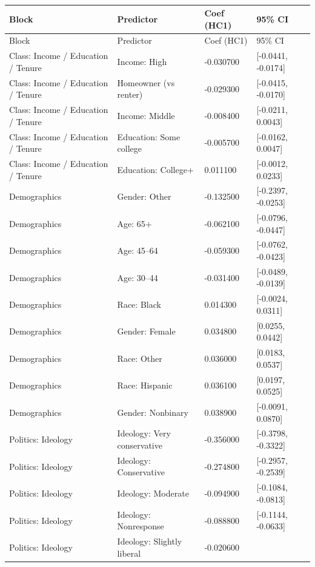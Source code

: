 \documentclass[
  letterpaper,
  DIV=11,
  numbers=noendperiod]{scrartcl}
\begin{document}
\begin{longtable}[]{@{}llll@{}}
\caption{}\label{T_fad71}\tabularnewline
\toprule\noalign{}
Block & Predictor & Coef (HC1) & 95\% CI \\
\midrule\noalign{}
\endfirsthead
\toprule\noalign{}
Block & Predictor & Coef (HC1) & 95\% CI \\
\midrule\noalign{}
\endhead
\bottomrule\noalign{}
\endlastfoot
Class: Income / Education / Tenure & Income: High & -0.030700 &
{[}-0.0441, -0.0174{]} \\
Class: Income / Education / Tenure & Homeowner (vs renter) & -0.029300 &
{[}-0.0415, -0.0170{]} \\
Class: Income / Education / Tenure & Income: Middle & -0.008400 &
{[}-0.0211, 0.0043{]} \\
Class: Income / Education / Tenure & Education: Some college & -0.005700
& {[}-0.0162, 0.0047{]} \\
Class: Income / Education / Tenure & Education: College+ & 0.011100 &
{[}-0.0012, 0.0233{]} \\
Demographics & Gender: Other & -0.132500 & {[}-0.2397, -0.0253{]} \\
Demographics & Age: 65+ & -0.062100 & {[}-0.0796, -0.0447{]} \\
Demographics & Age: 45--64 & -0.059300 & {[}-0.0762, -0.0423{]} \\
Demographics & Age: 30--44 & -0.031400 & {[}-0.0489, -0.0139{]} \\
Demographics & Race: Black & 0.014300 & {[}-0.0024, 0.0311{]} \\
Demographics & Gender: Female & 0.034800 & {[}0.0255, 0.0442{]} \\
Demographics & Race: Other & 0.036000 & {[}0.0183, 0.0537{]} \\
Demographics & Race: Hispanic & 0.036100 & {[}0.0197, 0.0525{]} \\
Demographics & Gender: Nonbinary & 0.038900 & {[}-0.0091, 0.0870{]} \\
Politics: Ideology & Ideology: Very conservative & -0.356000 &
{[}-0.3798, -0.3322{]} \\
Politics: Ideology & Ideology: Conservative & -0.274800 & {[}-0.2957,
-0.2539{]} \\
Politics: Ideology & Ideology: Moderate & -0.094900 & {[}-0.1084,
-0.0813{]} \\
Politics: Ideology & Ideology: Nonresponse & -0.088800 & {[}-0.1144,
-0.0633{]} \\
Politics: Ideology & Ideology: Slightly liberal & -0.020600 &

\end{longtable}
\end{document}
